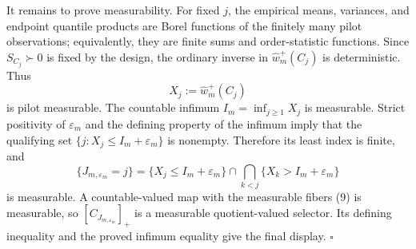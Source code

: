 It remains to prove measurability.  For fixed \(j\), the empirical means, variances, and endpoint quantile products are Borel functions of the finitely many pilot observations; equivalently, they are finite sums and order-statistic functions.  Since \(S_{C_j}\succ0\) is fixed by the design, the ordinary inverse in \(\widehat w_m^+(C_j)\) is deterministic.  Thus
\[
X_j:=\widehat w_m^+(C_j)
\]
is pilot measurable.  The countable infimum \(I_m=\inf_{j\ge1}X_j\) is measurable.  Strict positivity of \(\varepsilon_m\) and the defining property of the infimum imply that the qualifying set \(\{j:X_j\le I_m+\varepsilon_m\}\) is nonempty.  Therefore its least index is finite, and
\[
\{J_{m,\varepsilon_m}=j\}
=\{X_j\le I_m+\varepsilon_m\}
\cap\bigcap_{k<j}\{X_k>I_m+\varepsilon_m\}
\tag{9}
\]
is measurable.  A countable-valued map with the measurable fibers (9) is measurable, so \([C_{J_{m,\varepsilon_m}}]_+\) is a measurable quotient-valued selector.  Its defining inequality and the proved infimum equality give the final display. \(\square\)